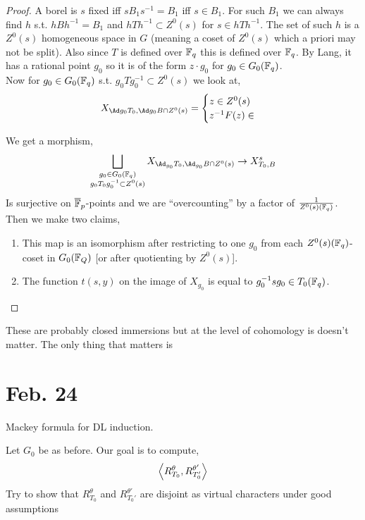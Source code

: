 \documentclass[12pt]{article}
\begin{document}
\begin{proof}
A borel is $s$ fixed iff $s B_1 s^{-1} = B_1$ iff $s \in B_1$. For such $B_1$ we can always find $h$ s.t. $h B h^{-1} = B_1$ and $h T h^{-1} \subset Z^0(s)$ for $s \in h T h^{-1}$. The set of such $h$ is a $Z^0(s)$ homogeneous space in $G$ (meaning a coset of $Z^0(s)$ which a priori may not be split). Also since $T$ is defined over $\mathbb{F}_q$ this is defined over $\mathbb{F}_q$. By Lang, it has a rational point $g_0$ so it is of the form $z \cdot g_0$ for $g_0 \in G_0(\mathbb{F}_q)$. 
\bigskip\\
Now for $g_0 \in G_0(\mathbb{F}_q)$ s.t. $g_0 T g_0^{-1} \subset Z^0(s)$ we look at,
\[ X_{\Ad g_0 T_0, \Ad g_0 B \cap Z^0(s)} = 
\begin{cases}
z \in Z^0(s)
\\
z^{-1} F(z) \in 
\end{cases} \]




We get a morphism,
\[ \bigsqcup_{\substack{ g_0 \in G_0(\FF_q) \\ g_0 T_0 g_0^{-1} \subset Z^0(s)}} X_{\Ad_{g_0} T_0, \Ad_{g_0} B \cap Z^0(s)} \to X^s_{T_0, B} \]
Is surjective on $\overline{\mathbb{F}}_p$-points and we are ``overcounting'' by a factor of $\frac{1}{Z^0(s)(\mathbb{F}_q)}$. Then we make two claims,
\begin{enumerate}
\item This map is an isomorphism after restricting to one $g_0$ from each $Z^0(s)(\mathbb{F}_q)$-coset in $G_0(\mathbb{F}_Q)$ [or after quotienting by $Z^0(s)$]. 

\item The function $t(s, y)$ on the image of $X_{g_0}$ is equal to $g_0^{-1} s g_0 \in T_0(\mathbb{F}_q)$. 
\end{enumerate}
\end{proof}

\begin{rmk}
These are probably closed immersions but at the level of cohomology is doesn't matter. The only thing that matters is 
\end{rmk}

\section{Feb. 24}

Mackey formula for DL induction.

Let $G_0$ be as before. Our goal is to compute,
\[ \left< R^\theta_{T_0}, R^{\theta'}_{T_0'} \right> \]
Try to show that $R^\theta_{T_0}$ and $R^{\theta'}_{T_0'}$ are disjoint as virtual characters under good assumptions
\end{document}
